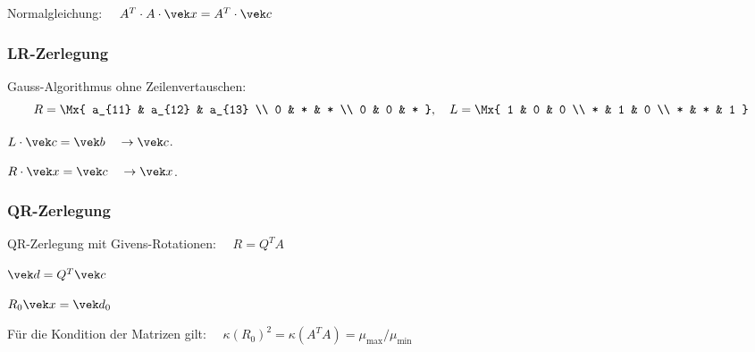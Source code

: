 		Normalgleichung: $\quad A^T \cdot A \cdot \vek x = A^T \cdot \vek c$

		\subsubsection{LR-Zerlegung}
			\begin{algo}
				\begin{tightenumerate}
					\item Gauss-Algorithmus ohne Zeilenvertauschen:
						\[
							R = \Mx{
								a_{11} & a_{12} & a_{13} \\
								0 & * & * \\
								0 & 0 & *
							}, \quad L = \Mx{
								1 & 0 & 0 \\
								* & 1 & 0 \\
								* & * & 1
							}
						\]
					\item $L\cdot \vek c = \vek b \quad \rightarrow \vek c$.
					\item $R \cdot \vek x = \vek c \quad \rightarrow \vek x$.
				\end{tightenumerate}
			\end{algo}

		\subsubsection{QR-Zerlegung}
			\begin{algo}
				\begin{tightenumerate}
					\item QR-Zerlegung mit Givens-Rotationen: $\quad R = Q^T A$
					\item $\vek d = Q^T \vek c$
					\item $R_0 \vek x = \vek d_0$
				\end{tightenumerate}
				Für die Kondition der Matrizen gilt: $\quad \kappa(R_0)^2 = \kappa(A^T A) = \mu_\text{max}/\mu_\text{min}$
			\end{algo}

